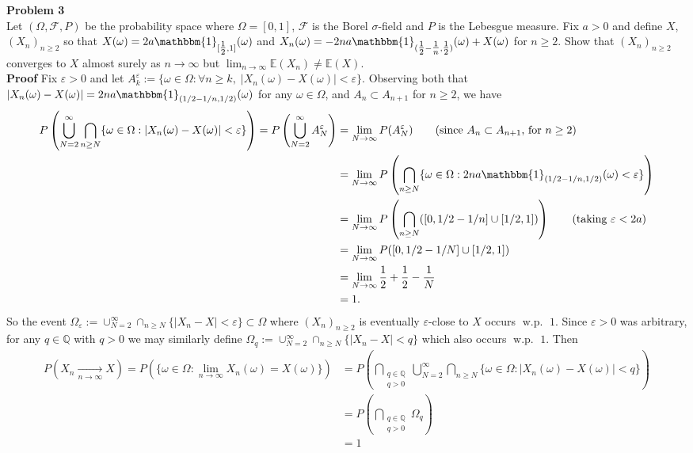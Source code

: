 \documentclass[10pt]{article}
\newcommand{\E}{\mathbb{E}}
\newcommand{\bp}[1]{\left({#1}\right)}
\newcommand{\mbb}[1]{\mathbb{#1}}
\newcommand{\1}[1]{\mathbbm{1}_{#1}}
\newcommand{\mc}[1]{\mathcal{#1}}
\DeclareMathOperator{\wip}{w.p.}
\begin{document}
    {\bf Problem 3}\\[5pt]
    Let $(\Omega,\mc{F},P)$ be the probability space where $\Omega=[0,1]$, $\mc{F}$ is the Borel $\sigma$-field and $P$ is the Lebesgue measure. Fix $a>0$ and define
    $X$, $(X_n)_{n\geq 2}$ so that $X(\omega)=2a\1{[\tfrac{1}{2},1]}(\omega)$ and $X_n(\omega)=-2na\1{(\tfrac{1}{2}-\tfrac{1}{n},\tfrac{1}{2})}(\omega)+X(\omega)$ for $n\geq 2$.
    Show that $(X_n)_{n\geq 2}$ converges to $X$ almost surely as $n\rightarrow\infty$ but $\lim_{n\rightarrow\infty}\E(X_n)\neq \E(X)$.\\[5pt]
    {\bf Proof}\hspace{5pt} Fix $\varepsilon>0$ and let $A^\varepsilon_k:=\{\omega\in\Omega:\forall n\geq k,\;|X_n(\omega)-X(\omega)|<\varepsilon\}$. Observing both that $|X_n(\omega)-X(\omega)|=2na\1{(1/2-1/n,1/2)}(\omega)$ for any $\omega\in\Omega$, and $A_n\subset A_{n+1}$ for $n\geq 2$, we have
    \begin{align*}
        P\bp{\bigcup_{N=2}^\infty\bigcap_{n\geq N}\{\omega\in\Omega:|X_n(\omega)-X(\omega)|<\varepsilon\}}=P\bp{\bigcup_{N=2}^\infty A_N^\varepsilon}&=\lim_{N\rightarrow\infty}P(A_N^\varepsilon)\tag{since $A_n\subset A_{n+1}$, for $n\geq 2$}\\
        &=\lim_{N\rightarrow\infty}P\bp{\bigcap_{n\geq N}\{\omega\in\Omega:2na\1{(1/2-1/n,1/2)}(\omega)<\varepsilon\}}\\
        &=\lim_{N\rightarrow\infty}P\bp{\bigcap_{n\geq N}([0,1/2-1/n]\cup[1/2,1])}\tag{taking $\varepsilon<2a$}\\
        &=\lim_{N\rightarrow\infty}P([0,1/2-1/N]\cup[1/2,1])\\
        &=\lim_{N\rightarrow\infty}\frac{1}{2}+\frac{1}{2}-\frac{1}{N}\\
        &=1.
    \end{align*}
    So the event $\Omega_\varepsilon:=\cup_{N=2}^\infty\cap_{n\geq N}\{|X_n-X|<\varepsilon\}\subset\Omega$ where $(X_n)_{n\geq 2}$ is eventually $\varepsilon$-close to $X$ occurs $\wip$ $1$. Since $\varepsilon>0$ was arbitrary, for any $q\in\mbb{Q}$ with $q>0$
    we may similarly define $\Omega_q:=\cup_{N=2}^\infty\cap_{n\geq N}\{|X_n-X|<q\}$ which also occurs $\wip$ $1$. Then
    \begin{align*}
        P\bp{X_n\underset{n\rightarrow\infty}{\longrightarrow}X}=P\bp{\{\omega\in\Omega:\lim_{n\rightarrow\infty}X_n(\omega)=X(\omega)\}}&=P\bp{\bigcap_{\substack{q\in\mbb{Q} \\ q>0}}\bigcup_{N=2}^\infty\bigcap_{n\geq N}\{\omega\in\Omega:|X_n(\omega)-X(\omega)|<q\}}\\
        &=P\bp{\bigcap_{\substack{q\in\mbb{Q} \\ q>0}}\Omega_q}\\
        &=1
    \end{align*}
\end{document}
